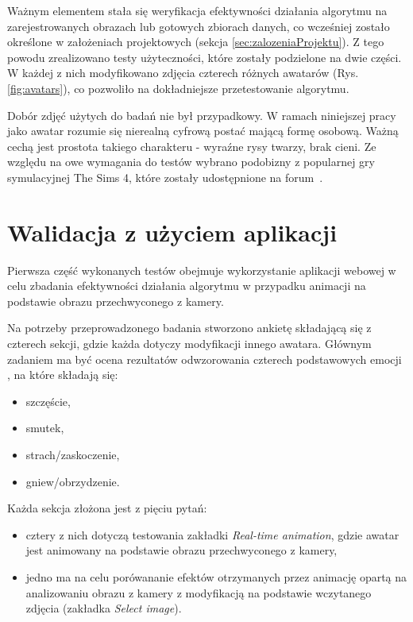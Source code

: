 Ważnym elementem stała się weryfikacja efektywności działania algorytmu na zarejestrowanych obrazach lub gotowych zbiorach danych, co wcześniej zostało określone w założeniach projektowych (sekcja \ref{sec:zalozeniaProjektu}). Z tego powodu zrealizowano testy użyteczności, które zostały podzielone na dwie części. W każdej z nich modyfikowano zdjęcia czterech różnych awatarów (Rys. \ref{fig:avatars}), co pozwoliło na dokładniejsze przetestowanie algorytmu.

Dobór zdjęć użytych do badań nie był przypadkowy. W ramach niniejszej pracy jako awatar rozumie się nierealną cyfrową postać mającą formę osobową. Ważną cechą jest prostota takiego charakteru - wyraźne rysy twarzy, brak cieni. Ze względu na owe wymagania do testów wybrano podobizny z popularnej gry symulacyjnej The Sims 4, które zostały udostępnione na forum~\cite{avatars}.


\section{Walidacja z użyciem aplikacji}
Pierwsza część wykonanych testów obejmuje wykorzystanie aplikacji webowej w celu zbadania efektywności działania algorytmu w przypadku animacji na podstawie obrazu przechwyconego z kamery. 

Na potrzeby przeprowadzonego badania stworzono ankietę składającą się z czterech sekcji, gdzie każda dotyczy modyfikacji innego awatara. Głównym zadaniem ma być ocena rezultatów odwzorowania czterech podstawowych emocji \cite{emotions}, na które składają się:

\begin{itemize}
    \item szczęście,
    \item smutek,
    \item strach/zaskoczenie,
    \item gniew/obrzydzenie.
\end{itemize}

Każda sekcja złożona jest z pięciu pytań:
\begin{itemize}
    \item cztery z nich dotyczą testowania zakładki \textit{Real-time animation}, gdzie awatar jest animowany na podstawie obrazu przechwyconego z kamery,
    \item jedno ma na celu porówananie efektów otrzymanych przez animację opartą na analizowaniu obrazu z kamery z modyfikacją na podstawie wczytanego zdjęcia (zakładka \textit{Select image}).
\end{itemize}

